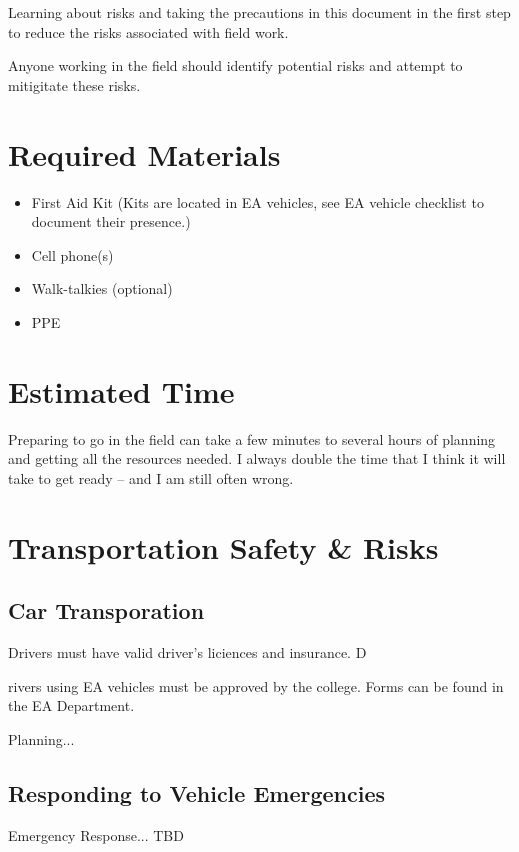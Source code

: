 \documentclass[12pt]{../SOP4_alpha}\usepackage[]{graphicx}\usepackage[]{color}
\begin{document}
\NP Learning about risks and taking the precautions in this document in the first step to reduce the risks associated with field work. 

\NP Anyone working in the field should identify potential risks and attempt to mitigitate these risks. 

\section{Required Materials}

\begin{itemize}
  \item First Aid Kit (Kits are located in EA vehicles, see EA vehicle checklist to document their presence.)
  \item Cell phone(s)
  \item Walk-talkies (optional)
  \item PPE
\end{itemize}

\section{Estimated Time}

\NP Preparing to go in the field can take a few minutes to several hours of planning and getting all the resources needed. I always double the time that I think it will take to get ready -- and I am still often wrong. 

\section{Transportation Safety \& Risks}

\subsection{Car Transporation}

\NP Drivers must have valid driver's liciences and insurance. D

\NP rivers using EA vehicles must be approved by the college. Forms can be found in the EA Department. 

\NP Planning...

\subsection{Responding to Vehicle Emergencies}

\NP Emergency Response... TBD
\end{document}
